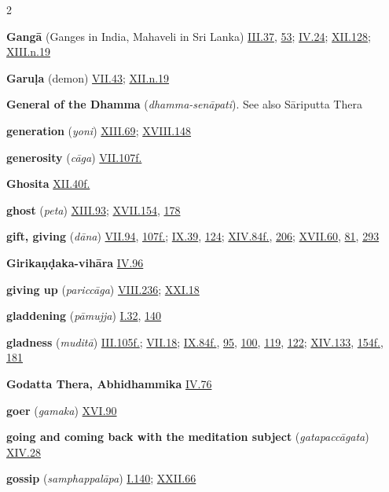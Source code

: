 \begin{multicols}{2}
\begin{vismHanging}
\par\textbf{Gangā} (Ganges in India, Mahaveli in Sri Lanka) \hyperlink{III.37}{III.37}{}, \hyperlink{III.53}{53}{}; \hyperlink{IV.24}{IV.24}{}; \hyperlink{XII.128}{XII.128}{}; \hyperlink{XIII.n19}{XIII.n.19}{}
\par\textbf{Garuḷa} (demon) \hyperlink{VII.43}{VII.43}{}; \hyperlink{XII.n19}{XII.n.19}{}
\par\textbf{General of the Dhamma} (\emph{dhamma-senāpati}). See also Sāriputta Thera 
\par\textbf{generation} (\emph{yoni}) \hyperlink{XIII.69}{XIII.69}{}; \hyperlink{XVIII.148}{XVIII.148}{}
\par\textbf{generosity} (\emph{cāga}) \hyperlink{VII.107}{VII.107f.}{}
\par\textbf{Ghosita} \hyperlink{XII.40}{XII.40f.}{}
\par\textbf{ghost} (\emph{peta}) \hyperlink{XIII.93}{XIII.93}{}; \hyperlink{XVII.154}{XVII.154}{}, \hyperlink{XVII.178}{178}{}
\par\textbf{gift, giving} (\emph{dāna}) \hyperlink{VII.94}{VII.94}{}, \hyperlink{VII.107}{107f.}{}; \hyperlink{IX.39}{IX.39}{}, \hyperlink{IX.124}{124}{}; \hyperlink{XIV.84}{XIV.84f.}{}, \hyperlink{XIV.206}{206}{}; \hyperlink{XVII.60}{XVII.60}{}, \hyperlink{XVII.81}{81}{}, \hyperlink{XVII.293}{293}{}
\par\textbf{Girikaṇḍaka-vihāra} \hyperlink{IV.96}{IV.96}{}
\par\textbf{giving up} (\emph{pariccāga}) \hyperlink{VIII.236}{VIII.236}{}; \hyperlink{XXI.18}{XXI.18}{}
\par\textbf{gladdening} (\emph{pāmujja}) \hyperlink{I.32}{I.32}{}, \hyperlink{I.140}{140}{}
\par\textbf{gladness} (\emph{muditā}) \hyperlink{III.105}{III.105f.}{}; \hyperlink{VII.18}{VII.18}{}; \hyperlink{IX.84}{IX.84f.}{}, \hyperlink{IX.95}{95}{}, \hyperlink{IX.100}{100}{}, \hyperlink{IX.119}{119}{}, \hyperlink{IX.122}{122}{}; \hyperlink{XIV.133}{XIV.133}{}, \hyperlink{XIV.154}{154f.}{}, \hyperlink{XIV.181}{181}{}
\par\textbf{Godatta Thera, Abhidhammika} \hyperlink{IV.76}{IV.76}{}
\par\textbf{goer} (\emph{gamaka}) \hyperlink{XVI.90}{XVI.90}{}
\par\textbf{going and coming back with the meditation subject} (\emph{gatapaccāgata}) \hyperlink{XIV.28}{XIV.28}{}
\par\textbf{gossip} (\emph{samphappalāpa}) \hyperlink{I.140}{I.140}{}; \hyperlink{XXII.66}{XXII.66}{}

\end{vismHanging}
\end{multicols}
